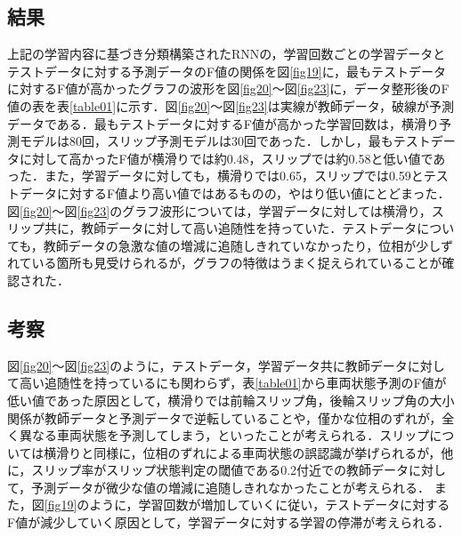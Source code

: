 \documentclass[twocolumn]{jsarticle}
\begin{document}
\subsection{結果}
上記の学習内容に基づき分類構築されたRNNの，学習回数ごとの学習データとテストデータに対する予測データのF値の関係を図\ref{fig19}に，最もテストデータに対するF値が高かったグラフの波形を図\ref{fig20}～図\ref{fig23}に，データ整形後のF値の表を表\ref{table01}に示す．図\ref{fig20}～図\ref{fig23}は実線が教師データ，破線が予測データである．最もテストデータに対するF値が高かった学習回数は，横滑り予測モデルは80回，スリップ予測モデルは30回であった．しかし，最もテストデータに対して高かったF値が横滑りでは約0.48，スリップでは約0.58と低い値であった．また，学習データに対しても，横滑りでは0.65，スリップでは0.59とテストデータに対するF値より高い値ではあるものの，やはり低い値にとどまった．
図\ref{fig20}～図\ref{fig23}のグラフ波形については，学習データに対しては横滑り，スリップ共に，教師データに対して高い追随性を持っていた．テストデータについても，教師データの急激な値の増減に追随しきれていなかったり，位相が少しずれている箇所も見受けられるが，グラフの特徴はうまく捉えられていることが確認された．

\subsection{考察}
図\ref{fig20}～図\ref{fig23}のように，テストデータ，学習データ共に教師データに対して高い追随性を持っているにも関わらず，表\ref{table01}から車両状態予測のF値が低い値であった原因として，横滑りでは前輪スリップ角，後輪スリップ角の大小関係が教師データと予測データで逆転していることや，僅かな位相のずれが，全く異なる車両状態を予測してしまう，といったことが考えられる．スリップについては横滑りと同様に，位相のずれによる車両状態の誤認識が挙げられるが，他に，スリップ率がスリップ状態判定の閾値である0.2付近での教師データに対して，予測データが微少な値の増減に追随しきれなかったことが考えられる．
また，図\ref{fig19}のように，学習回数が増加していくに従い，テストデータに対するF値が減少していく原因として，学習データに対する学習の停滞が考えられる．
\end{document}
